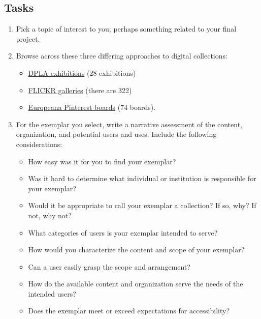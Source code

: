 \documentclass[]{article}
\providecommand{\tightlist}{%
  \setlength{\itemsep}{0pt}\setlength{\parskip}{0pt}}
\begin{document}
\subsection{Tasks}\label{tasks-1}

\begin{enumerate}
\def\labelenumi{\arabic{enumi}.}
\tightlist
\item
  Pick a topic of interest to you; perhaps something related to your
  final project.
\item
  Browse across these three differing approaches to digital collections:

  \begin{itemize}
  \tightlist
  \item
    \href{http://dp.la/exhibitions}{DPLA exhibitions} (28 exhibitions)
  \item
    \href{https://www.flickr.com/photos/flickr/galleries}{FLICKR
    galleries} (there are 322)
  \item
    \href{https://www.pinterest.com/europeana/}{Europeana Pinterest
    boards} (74 boards).
  \end{itemize}
\item
  For the exemplar you select, write a narrative assessment of the
  content, organization, and potential users and uses. Include the
  following considerations:

  \begin{itemize}
  \tightlist
  \item
    How easy was it for you to find your exemplar?
  \item
    Was it hard to determine what individual or institution is
    responsible for your exemplar?
  \item
    Would it be appropriate to call your exemplar a collection? If so,
    why? If not, why not?
  \item
    What categories of users is your exemplar intended to serve?
  \item
    How would you characterize the content and scope of your exemplar?
  \item
    Can a user easily grasp the scope and arrangement?
  \item
    How do the available content and organization serve the needs of the
    intended users?
  \item
    Does the exemplar meet or exceed expectations for accessibility?
  \end{itemize}
\end{enumerate}
\end{document}
